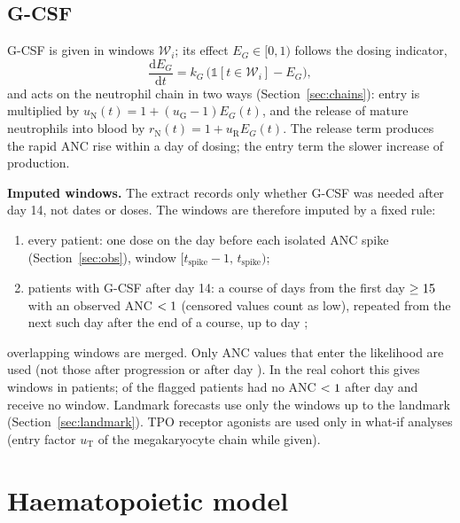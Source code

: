 \documentclass[11pt]{article}
\newcommand{\dd}{\mathrm{d}}
\newcommand{\one}{\mathbb{1}}
\begin{document}
\subsection{G-CSF}\label{sec:gcsf}
G-CSF is given in windows $\mathcal W_i$; its effect $E_G\in[0,1)$ follows the dosing indicator,
\begin{equation}
\frac{\dd E_G}{\dd t} = k_G\,\bigl(\one[t\in\mathcal W_i] - E_G\bigr), \label{eq:gcsf}
\end{equation}
and acts on the neutrophil chain in two ways (Section~\ref{sec:chains}): entry is multiplied by $u_{\mathrm{N}}(t)=1+(u_{\mathrm{G}}-1)E_G(t)$, and the release of mature neutrophils into blood by $r_{\mathrm{N}}(t)=1+u_{\mathrm{R}}E_G(t)$. The release term produces the rapid ANC rise within a day of dosing; the entry term the slower increase of production.

\textbf{Imputed windows.} The extract records only whether G-CSF was needed after day 14, not dates or doses. The windows are therefore imputed by a fixed rule:
\begin{enumerate}
\item every patient: one dose on the day before each isolated ANC spike (Section~\ref{sec:obs}), window $[t_{\mathrm{spike}}-1,\,t_{\mathrm{spike}})$;
\item patients with G-CSF after day 14: a course of \valGcsfDays{} days from the first day $\geq15$ with an observed ANC $<1$ (censored values count as low), repeated from the next such day after the end of a course, up to day \valGcsfUntil;
\end{enumerate}
overlapping windows are merged. Only ANC values that enter the likelihood are used (not those after progression or after day \valObsMax). In the real cohort this gives \valGcsfWin{} windows in \valGcsfPts{} patients; \valGcsfNoWin{} of the \valGcsfFlagged{} flagged patients had no ANC $<1$ after day \valGcsfFrom{} and receive no window. Landmark forecasts use only the windows up to the landmark (Section~\ref{sec:landmark}). TPO receptor agonists are used only in what-if analyses (entry factor $u_{\mathrm{T}}$ of the megakaryocyte chain while given).

\section{Haematopoietic model}
\end{document}
